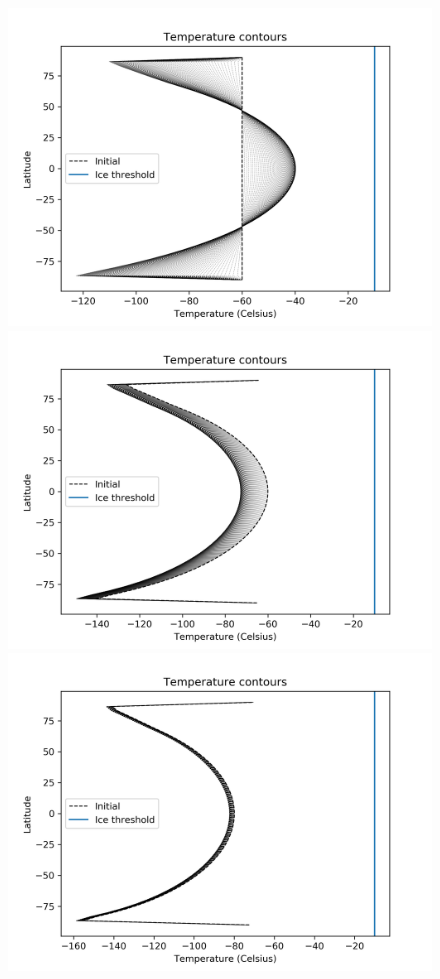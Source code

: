 \documentclass{article}
\begin{document}
\begin{figure}
\includegraphics[scale=0.4]{tcont_50.png} 
\includegraphics[scale=0.4]{tcont_52.png} 
\includegraphics[scale=0.4]{tcont_54.png} 

\end{figure}
\end{document}
